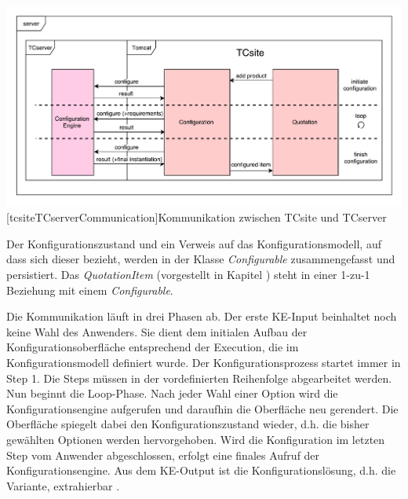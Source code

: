 \documentclass[12pt,a4paper,bibliography=totocnumbered,listof=totoc]{scrartcl}
\begin{document}
\vspace{1em}
\begin{minipage}{\linewidth}
	\centering
	\includegraphics[width=1\linewidth]{Abbildungen/tcsiteTCserverCommunication.pdf}
	[tcsiteTCserverCommunication]{Kommunikation zwischen TCsite und TCserver}
	\label{fig:tcsiteTCserverCommunication}
\end{minipage}
\vspace{1em}

Der Konfigurationszustand und ein Verweis auf das Konfigurationsmodell, auf dass  sich dieser bezieht, werden in der Klasse \emph{Configurable} zusammengefasst und persistiert. Das \emph{QuotationItem} (vorgestellt in Kapitel  \label{subsubsection:tcsiteArchitektur}) steht in einer 1-zu-1 Beziehung mit einem \emph{Configurable}.

Die Kommunikation läuft in drei Phasen ab. Der erste KE-Input beinhaltet noch keine Wahl des Anwenders. Sie dient dem initialen Aufbau der Konfigurationsoberfläche entsprechend der Execution, die im Konfigurationsmodell definiert wurde. Der Konfigurationsprozess startet immer in Step 1. Die Steps müssen in der vordefinierten Reihenfolge abgearbeitet werden. Nun beginnt die Loop-Phase. Nach jeder Wahl einer Option wird die Konfigurationsengine aufgerufen und daraufhin die Oberfläche neu gerendert. Die Oberfläche spiegelt dabei den Konfigurationszustand wieder, d.h. die bisher gewählten Optionen werden hervorgehoben. Wird die Konfiguration im letzten Step vom Anwender abgeschlossen, erfolgt eine finales Aufruf der Konfigurationsengine. Aus dem KE-Output ist die Konfigurationslösung, d.h. die Variante, extrahierbar \citep{tactonTCsiteDevelopmentManual}.
\end{document}
